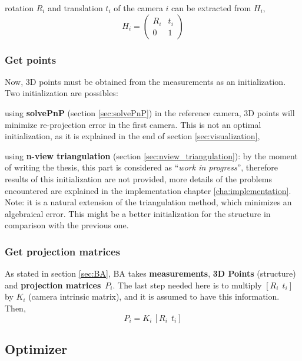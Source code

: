 rotation $R_i$ and translation $t_i$ of the camera $i$ can be extracted from $H_i$,
\begin{equation}
 H_i = \begin{pmatrix}
        R_i & t_i \\
        0   & 1
        \end{pmatrix}
\end{equation}

\subsubsection*{Get points}

Now, 3D points must be obtained from the measurements as an initialization. Two initialization are possibles:
\begin{itemize*}
 \item using \textbf{solvePnP} (section \ref{sec:solvePnP}) in the reference camera, 3D points will minimize re-projection error in the first camera. This is not an optimal initialization, as it is explained in the end of section \ref{sec:visualization},

 \item using \textbf{n-view triangulation} (section \ref{sec:nview_triangulation}): by the moment of writing the thesis, this part is considered as ``\textit{work in progress}'', therefore results of this initialization are not provided, more details of the problems encountered are explained in the implementation chapter \ref{cha:implementation}. Note: it is a natural extension of the triangulation method, which minimizes an algebraical error. This might be a better initialization for the structure in comparison with the previous one.
\end{itemize*}



\subsubsection*{Get projection matrices}

As stated in section \ref{sec:BA}, BA takes \textbf{measurements}, \textbf{3D Points} (structure) and \textbf{projection matrices}~$P_i$. The last step needed here is to multiply $[R_i ~~ t_i]$ by $K_i$ (camera intrinsic matrix), and it is assumed to have this information. Then,
\[
 P_i = K_i \, [R_i ~~ t_i]
\]


\subsection{Optimizer}

